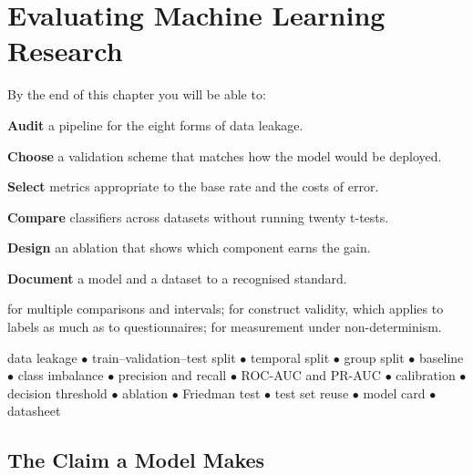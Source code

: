 \chapter{Evaluating Machine Learning Research}\label{ch:mleval}

\begin{outcomes}
By the end of this chapter you will be able to:
\begin{tight}
  \item \textbf{Audit} a pipeline for the eight forms of data leakage.
  \item \textbf{Choose} a validation scheme that matches how the model would be
    deployed.
  \item \textbf{Select} metrics appropriate to the base rate and the costs of
    error.
  \item \textbf{Compare} classifiers across datasets without running twenty
    t-tests.
  \item \textbf{Design} an ablation that shows which component earns the gain.
  \item \textbf{Document} a model and a dataset to a recognised standard.
\end{tight}
\end{outcomes}

\begin{prereq}
 for multiple comparisons and intervals; 
for construct validity, which applies to labels as much as to questionnaires;
 for measurement under non-determinism.
\end{prereq}

\begin{keyterms}
data leakage $\bullet$ train--validation--test split $\bullet$ temporal split
$\bullet$ group split $\bullet$ baseline $\bullet$ class imbalance $\bullet$
precision and recall $\bullet$ ROC-AUC and PR-AUC $\bullet$ calibration
$\bullet$ decision threshold $\bullet$ ablation $\bullet$ Friedman test
$\bullet$ test set reuse $\bullet$ model card $\bullet$ datasheet
\end{keyterms}

\section{The Claim a Model Makes}

